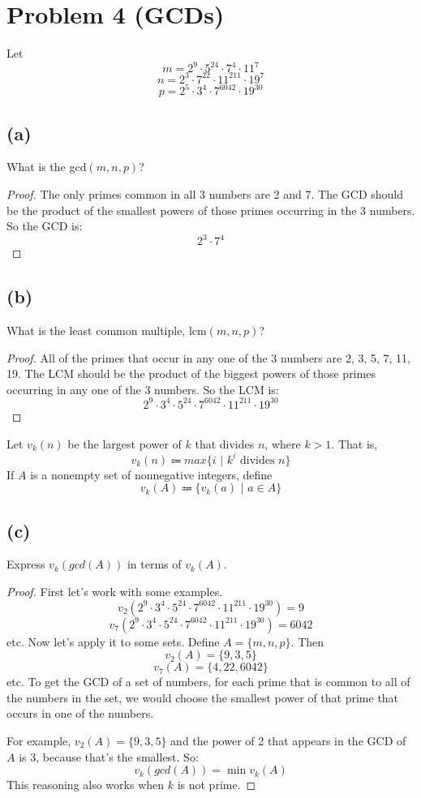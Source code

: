 \documentclass[14pt]{extarticle}
\begin{document}
\section{Problem 4 (GCDs)}
Let
$$
m = 2^9 \cdot 5^{24} \cdot 7^4 \cdot 11^7
$$
$$
n = 2^3 \cdot 7^{22} \cdot 11^{211} \cdot 19^7
$$
$$
p = 2^5 \cdot 3^4 \cdot 7^{6042} \cdot 19^{30}
$$
\subsection{(a)} 
What is the gcd$(m, n, p)$?
\begin{proof}
The only primes common in all 3 numbers are 2 and 7. The GCD should be the product of the smallest powers of those primes occurring in the 3 numbers. So the GCD is: 
$$
2^3 \cdot 7^4
$$
\end{proof}

\subsection{(b)} 
What is the least common multiple, lcm$(m, n, p)$?
\begin{proof}
All of the primes that occur in any one of the 3 numbers are 2, 3, 5, 7, 11, 19. The LCM should be the product of the biggest powers of those primes occurring in any one of the 3 numbers. So the LCM is:
$$
2^9 \cdot 3^4 \cdot 5^{24} \cdot 7^{6042} \cdot 11^{211} \cdot 19^{30}
$$
\end{proof}

Let $v_k(n)$ be the largest power of $k$ that divides $n$, where $k > 1$. That is, 
$$
v_k(n) \Coloneqq max\{i \,\,|\,\, k^i \text{ divides }n\} 
$$
If $A$ is a nonempty set of nonnegative integers, define 
$$
v_k(A) \Coloneqq \{v_k(a)\,\,|\,\, a \in A\}
$$
\subsection{(c)} 
Express $v_k(gcd(A))$ in terms of $v_k(A)$.
\begin{proof}
First let's work with some examples.
$$
v_2(2^9 \cdot 3^4 \cdot 5^{24} \cdot 7^{6042} \cdot 11^{211} \cdot 19^{30}) = 9
$$
$$
v_7(2^9 \cdot 3^4 \cdot 5^{24} \cdot 7^{6042} \cdot 11^{211} \cdot 19^{30}) = 6042
$$
etc. Now let's apply it to some sets. Define $A = \{m,n,p\}$. Then
$$
v_2(A) = \{9, 3, 5\}
$$
$$
v_7(A) = \{4, 22, 6042\}
$$
etc. To get the GCD of a set of numbers, for each prime that is common to all of the numbers in the set, we would choose the smallest power of that prime that occurs in one of the numbers.

For example, $v_2(A) = \{9, 3, 5\}$ and the power of 2 that appears in the GCD of $A$ is 3, because that's the smallest. So:
$$
v_k(gcd(A)) = \min v_k(A)
$$
This reasoning also works when $k$ is not prime.
\end{proof}
\end{document}

